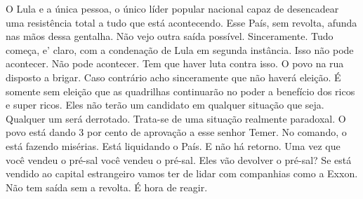 \falaM O Lula e a única pessoa, o único líder popular nacional capaz de
desencadear uma resistência total a tudo que está acontecendo. Esse
País, sem revolta, afunda nas mãos dessa gentalha. Não vejo outra saída
possível. Sinceramente. Tudo começa, e' claro, com a condenação de Lula
em segunda instância. Isso não pode acontecer. Não pode acontecer. Tem
que haver luta contra isso. O povo na rua disposto a brigar. Caso
contrário acho sinceramente que não haverá eleição. É somente sem
eleição que as quadrilhas continuarão no poder a benefício dos ricos e
super ricos. Eles não terão um candidato em qualquer situação que seja.
Qualquer um será derrotado. Trata-se de uma situação realmente
paradoxal. O povo está dando 3 por cento de aprovação a esse senhor
Temer. No comando, o está fazendo misérias. Está liquidando o País. E
não há retorno. Uma vez que você vendeu o pré-sal você vendeu o pré-sal.
Eles vão devolver o pré-sal? Se está vendido ao capital estrangeiro
vamos ter de lidar com companhias como a Exxon. Não tem saída sem a
revolta. É hora de reagir.
